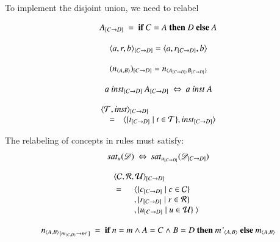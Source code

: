\documentclass{elsarticle}
\begin{document}
To implement the disjoint union, we need to relabel 
\begin{definition}
   \[\subst{C}{D}{A}\ =\ \text{\bf if}\ C=A\ \text{\bf then}\ D\ \text{\bf else}\ A\]
\end{definition}
\begin{definition}
   \[\subst{C}{D}{\triple{a}{r}{b}} = \triple{a}{\subst{C}{D}{r}}{b}\]
\end{definition}
\begin{definition}
   \[\subst{C}{D}{(\declare{n}{A}{B})} = \declare{n}{\subst{C}{D}{A}}{\subst{C}{D}{B}}\]
\end{definition}
\begin{definition}
   \[a\ \subst{C}{D}{\inst}\ \subst{C}{D}{A}\ \Leftrightarrow\ a\ \inst\ A\]
\end{definition}
\begin{definition}
   \[\begin{array}{rcl}
      \rlap{$\subst{C}{D}{\pair{\triples}{\inst}}$}\\
      &=&\pair{\{\subst{C}{D}{t}\mid t\in\triples\}}{\subst{C}{D}{\inst}}
   \end{array}\]
\end{definition}
   The relabeling of concepts in rules must satisfy:
\begin{equation}
   \sat{u}{\dataset}\ \Leftrightarrow\ \sat{\subst{C}{D}{u}}{\subst{C}{D}{\dataset}}
\end{equation}
\begin{definition}
   \begin{eqnarray}
      \rlap{$\subst{C}{D}{\triple{\concepts}{\rels}{\rules}}$}\notag\\
      &=&\begin{array}[t]{l@{}l}
         \la&\{\subst{C}{D}{c}\mid c\in\concepts\}\\
         ,&\{\subst{C}{D}{r}\mid r\in\rels\}\\
         ,&\{\subst{C}{D}{u}\mid u\in\rules\}\ \ra\notag
         \end{array}
   \end{eqnarray}
\end{definition}
\begin{definition}
   \[\subst{\declare{m}{C}{D}}{m'}{{\declare{n}{A}{B}}}\ =\ \text{\bf if}\ n=m\wedge A=C\wedge B=D\ \text{\bf then}\ \declare{m'}{A}{B}\ \text{\bf else}\ \declare{m}{A}{B}\]
\end{definition}
\end{document}
